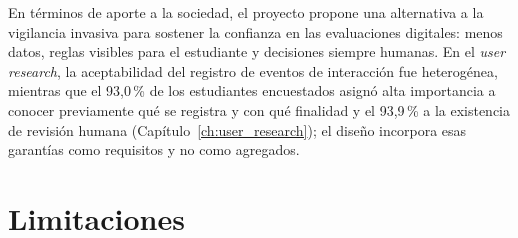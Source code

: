 En términos de aporte a la sociedad, el proyecto propone una alternativa a la vigilancia invasiva para sostener la confianza en las evaluaciones digitales: menos datos, reglas visibles para el estudiante y decisiones siempre humanas. En el \textit{user research}, la aceptabilidad del registro de eventos de interacción fue heterogénea, mientras que el 93,0\,\% de los estudiantes encuestados asignó alta importancia a conocer previamente qué se registra y con qué finalidad y el 93,9\,\% a la existencia de revisión humana (Capítulo~\ref{ch:user_research}); el diseño incorpora esas garantías como requisitos y no como agregados.

\section{Limitaciones}
\label{sec:concl_limitaciones}


